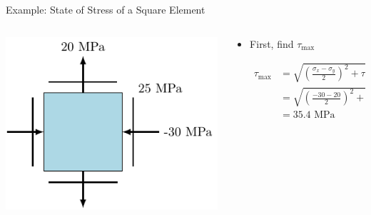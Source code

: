 \documentclass[10pt, svgnames]{beamer}
\begin{document}
\begin{frame}[label={sec:org769db6b}]{Example: State of Stress of a Square Element}
\begin{columns}
\begin{column}{0.4\columnwidth}
\begin{center}
\includegraphics[width=\textwidth]{pictures/example-I-prob.pdf}
\end{center}
\end{column}

\begin{column}{0.6\columnwidth}
\begin{itemize}
\item First, find \(\tau_{\max}\)

\begin{align*}
  \tau_{\max} &= \sqrt {\left( \frac{\sigma_x - \sigma_y}{2} \right)^2 + \tau _{xy}^2}  \\
              &= \sqrt {\left( \frac{-30 - 20}{2} \right)^2 + 25^2}  \\
              &= 35.4 \text{ MPa}
\end{align*}
\end{itemize}
\end{column}
\end{columns}
\end{frame}
\end{document}
